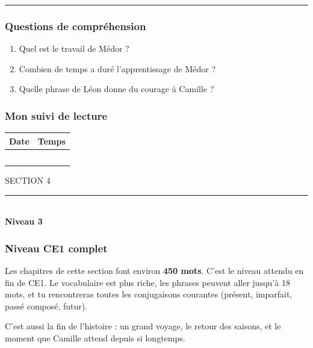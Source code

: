 \documentclass[
  french,
  french,
  14pt,
  a4paper]{extarticle}
\providecommand{\tightlist}{%
  \setlength{\itemsep}{0pt}\setlength{\parskip}{0pt}}
\newcommand{\sectiondivider}[2]{%
  \vspace*{2cm}%
  \begin{center}
    {\fontsize{18pt}{22pt}\selectfont\textcolor{accentcolor}{\MakeUppercase{Section #1}}}\\[0.6em]
    \textcolor{accentcolor}{\rule{0.35\textwidth}{1.5pt}}\\[1em]
    {\fontsize{38pt}{44pt}\selectfont\bfseries #2}
  \end{center}
  \vspace{1.5cm}
}
\begin{document}
{\begin{center}\rule{0.5\linewidth}{0.5pt}\end{center}

\subsubsection{Questions de
compréhension}\label{questions-de-compruxe9hension-11}

\begin{enumerate}
\def\labelenumi{\arabic{enumi}.}
\tightlist
\item
  Quel est le travail de Médor ?
\item
  Combien de temps a duré l'apprentissage de Médor ?
\item
  Quelle phrase de Léon donne du courage à Camille ?
\end{enumerate}

\subsubsection{Mon suivi de lecture}\label{mon-suivi-de-lecture-11}

\begin{center}
\begin{tabularx}{\textwidth}{|X|X|}
\hline
\textbf{Date} & \textbf{Temps} \\
\hline
& \\
\hline
& \\
\hline
& \\
\hline
& \\
\hline
& \\
\hline
\end{tabularx}
\end{center}

}%
\newpage

\sectiondivider{4}{Niveau 3}

\subsubsection{Niveau CE1 complet}\label{niveau-ce1-complet}

Les chapitres de cette section font environ \textbf{450 mots}. C'est le
niveau attendu en fin de CE1. Le vocabulaire est plus riche, les phrases
peuvent aller jusqu'à 18 mots, et tu rencontreras toutes les
conjugaisons courantes (présent, imparfait, passé composé, futur).

C'est aussi la fin de l'histoire : un grand voyage, le retour des
saisons, et le moment que Camille attend depuis si longtemps.
\end{document}
